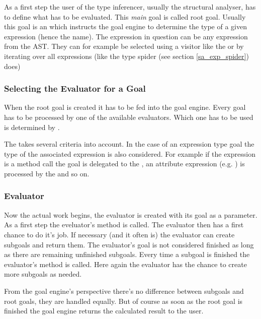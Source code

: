 \documentclass[12pt,halfparskip,DIV11,BCOR10mm]{scrreprt}
\begin{document}
As a first step the user of the type inferencer, usually the structural analyser, has to define what has to be evaluated. This \emph{main} goal is called root goal. Usually this goal is an  which instructs the goal engine to determine the type of a given expression (hence the name). The expression in question can be any expression from the AST. They can for example be selected using a visitor like the  or by iterating over all expressions (like the type spider (see section \vref{sa_exp_spider}) does)

\subsubsection{Selecting the Evaluator for a Goal}

When the root goal is created it has to be fed into the goal engine. Every goal has to be processed by one of the available evaluators. Which one has to be used is determined by .

The  takes several criteria into account. In the case of an expression type goal the type of the associated expression is also considered. For example if the expression is a method call the goal is delegated to the , an attribute expression (e.g. ) is processed by the  and so on.

\subsubsection{Evaluator}

Now the actual work begins, the evaluator is created with its goal as a parameter. As a first step the eveluator's  method is called. The evaluator then has a first chance to do it's job. If necessary (and it often is) the evaluator can create subgoals and return them. The evaluator's goal is not considered finished as long as there are remaining unfinished subgoals. Every time a subgoal is finished the evaluator's  method is called. Here again the evaluator has the chance to create more subgoals as needed.

From the goal engine's perspective there's no difference between subgoals and root goals, they are handled equally. But of course as soon as the root goal is finished the goal engine returns the calculated result to the user.
    
\end{document}
